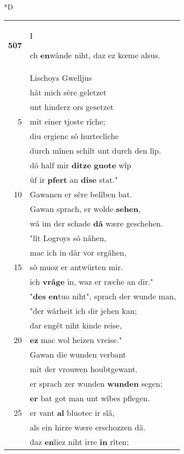 \documentclass[8pt,a4paper,notitlepage]{article}
\begin{document}
\begin{table}[ht]
\begin{minipage}[t]{0.5\linewidth}
\small
\begin{center}*D
\end{center}
\begin{tabular}{rl}
\textbf{507} & \begin{large}I\end{large}ch \textbf{en}wânde niht, daz ez kœme alsus.\\ 
 & Lischoys Gwelljus\\ 
 & hât mich sêre geletzet\\ 
 & unt hinderz ors gesetzet\\ 
5 & mit einer tjoste rîche;\\ 
 & diu ergienc sô hurteclîche\\ 
 & durch mînen schilt unt durch den lîp.\\ 
 & dô half mir \textbf{ditze} \textbf{guote} wîp\\ 
 & ûf ir \textbf{pfert} an \textbf{dise} stat."\\ 
10 & Gawanen er sêre belîben bat.\\ 
 & Gawan sprach, er wolde \textbf{sehen},\\ 
 & wâ im der schade \textbf{dâ} wære geschehen.\\ 
 & "lît Logroys sô nâhen,\\ 
 & mac ich in dâr vor ergâhen,\\ 
15 & sô muoz er antwürten mir.\\ 
 & ich \textbf{vrâge} in, waz er ræche an dir."\\ 
 & "\textbf{des} \textbf{en}tuo niht", sprach der wunde man,\\ 
 & "der wârheit ich dir jehen kan;\\ 
 & dar engêt niht kinde reise,\\ 
20 & \textbf{ez} mac wol heizen vreise."\\ 
 & Gawan die wunden verbant\\ 
 & mit der vrouwen houbtgewant.\\ 
 & er sprach zer wunden \textbf{wunden} segen;\\ 
 & \textbf{er} bat got man unt wîbes pflegen.\\ 
25 & er vant \textbf{al} bluotec ir slâ,\\ 
 & als ein hirze wære erschozzen dâ.\\ 
 & daz \textbf{en}liez niht irre \textbf{in} rîten;\\ 

\end{tabular}
\end{minipage}
\end{table}
\end{document}
